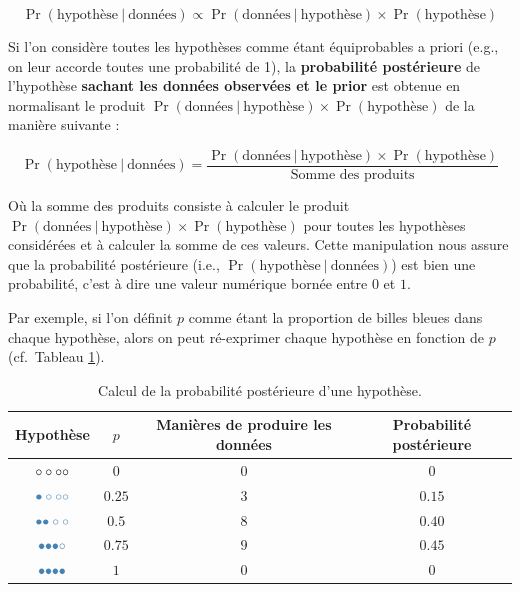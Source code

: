 \documentclass[
  a4paper,11pt,twoside,onecolumn,openright,final,oldfontcommands]{memoir}
\theoremstyle{definition}
\theoremstyle{definition}
\theoremstyle{definition}
\theoremstyle{definition}
\theoremstyle{remark}
\begin{document}
\[
\Pr(\text{hypothèse} \ | \ \text{données}) \propto \Pr(\text{données} \ | \ \text{hypothèse}) \times \Pr(\text{hypothèse})
\]

Si l'on considère toutes les hypothèses comme étant équiprobables a priori (e.g., on leur accorde toutes une probabilité de 1), la \textbf{probabilité postérieure} de l'hypothèse \textbf{sachant les données observées et le prior} est obtenue en normalisant le produit \(\Pr(\text{données} \ | \ \text{hypothèse}) \times \Pr(\text{hypothèse})\) de la manière suivante :

\[
\Pr(\text{hypothèse} \ | \ \text{données}) = \frac{\Pr(\text{données} \ | \ \text{hypothèse}) \times \Pr(\text{hypothèse})}{\text{Somme des produits}}
\]

Où la somme des produits consiste à calculer le produit \(\Pr(\text{données} \ | \ \text{hypothèse}) \times \Pr(\text{hypothèse})\) pour toutes les hypothèses considérées et à calculer la somme de ces valeurs. Cette manipulation nous assure que la probabilité postérieure (i.e., \(\Pr(\text{hypothèse} \ | \ \text{données})\)) est bien une probabilité, c'est à dire une valeur numérique bornée entre \(0\) et \(1\).

Par exemple, si l'on définit \(p\) comme étant la proportion de billes bleues dans chaque hypothèse, alors on peut ré-exprimer chaque hypothèse en fonction de \(p\) (cf.~Tableau \ref{tab:enumeration-table}).

\begin{table}[!htb]

\begin{center}
\begin{threeparttable}

\caption{\label{tab:enumeration-table}Calcul de la probabilité postérieure d'une hypothèse.}

\begin{tabular}{cccc}
\toprule
Hypothèse & $p$ & Manières de produire les données & Probabilité postérieure\\
\midrule
$\LARGE \circ \circ \circ \circ$ & $0$ & $0$ & $0$\\
$\LARGE \color{steelblue}{\bullet} \circ \circ \circ$ & $0.25$ & $3$ & $0.15$\\
$\LARGE \color{steelblue}{\bullet} \color{steelblue}{\bullet} \circ \circ$ & $0.5$ & $8$ & $0.40$\\
$\LARGE \color{steelblue}{\bullet} \color{steelblue}{\bullet} \color{steelblue}{\bullet} \circ$ & $0.75$ & $9$ & $0.45$\\
$\LARGE \color{steelblue}{\bullet} \color{steelblue}{\bullet} \color{steelblue}{\bullet} \color{steelblue}{\bullet}$ & $1$ & $0$ & $0$\\
\bottomrule
\end{tabular}

\end{threeparttable}
\end{center}

\end{table}
\end{document}
